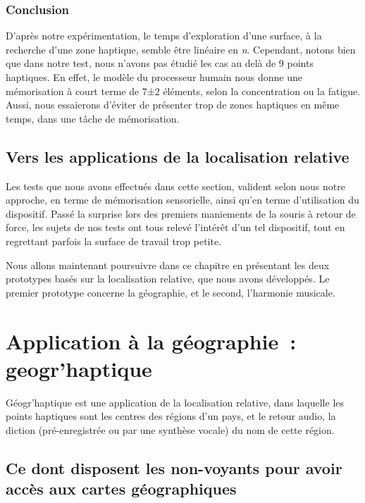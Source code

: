 \documentclass[
]{book}
\begin{document}
\hypertarget{conclusion-4}{%
\subsubsection{Conclusion}\label{conclusion-4}}

D'après notre expérimentation, le temps d'exploration d'une surface, à la
recherche d'une zone haptique, semble être linéaire en \emph{n}. Cependant,
notons bien que dans notre test, nous n'avons
pas étudié les cas au delà de 9 points haptiques. En effet, le modèle du
processeur humain nous donne une mémorisation à court terme de 7±2 éléments,
selon la concentration ou la fatigue. Aussi, nous essaierons d'éviter de
présenter trop de zones haptiques en même temps, dans une tâche de
mémorisation.

\hypertarget{vers-les-applications-de-la-localisation-relative}{%
\subsection{Vers les applications de la localisation relative}\label{vers-les-applications-de-la-localisation-relative}}

Les tests que nous avons effectués dans cette section, valident selon nous
notre approche, en terme de mémorisation sensorielle, ainsi qu'en terme
d'utilisation du dispositif. Passé la surprise lors des premiers maniements
de la souris à retour de force, les sujets de nos tests ont tous relevé
l'intérêt d'un tel dispositif, tout en regrettant parfois la surface de
travail trop petite.

Nous allons maintenant poursuivre dans ce chapitre en présentant les deux
prototypes basés sur la localisation relative, que nous avons développés. Le
premier prototype concerne la géographie, et le second, l'harmonie
musicale.

\hypertarget{geogrhaptique}{%
\section{Application à la géographie~: geogr'haptique}\label{geogrhaptique}}

Géogr'haptique est une application de la localisation relative, dans
laquelle les points haptiques sont les centres des régions d'un pays, et le
retour audio, la diction (pré-enregistrée ou par une synthèse vocale) du nom
de cette région.

\hypertarget{ce-dont-disposent-les-non-voyants-pour-avoir-accuxe8s-aux-cartes-guxe9ographiques}{%
\subsection{Ce dont disposent les non-voyants pour avoir accès aux cartes géographiques}\label{ce-dont-disposent-les-non-voyants-pour-avoir-accuxe8s-aux-cartes-guxe9ographiques}}
\end{document}

